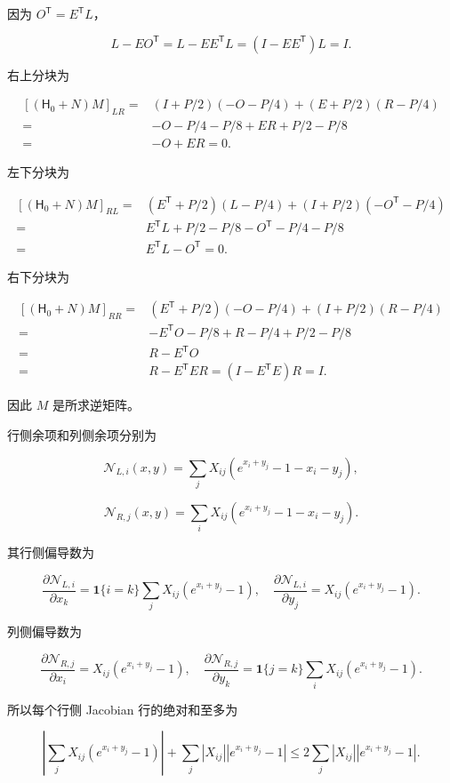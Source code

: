 \documentclass[11pt,a4paper]{article}
\begin{document}
因为 \(O^{\mathsf T}=E^{\mathsf T}L\)，

\[
L-EO^{\mathsf T}=L-EE^{\mathsf T}L=(I-EE^{\mathsf T})L=I.
\]

右上分块为

\[
\begin{aligned}
[(\mathsf H_0+N)M]_{LR}
={}&(I+P/2)(-O-P/4)+(E+P/2)(R-P/4)\\
={}&-O-P/4-P/8+ER+P/2-P/8\\
={}&-O+ER=0.
\end{aligned}
\]

左下分块为

\[
\begin{aligned}
[(\mathsf H_0+N)M]_{RL}
={}&(E^{\mathsf T}+P/2)(L-P/4)+(I+P/2)(-O^{\mathsf T}-P/4)\\
={}&E^{\mathsf T}L+P/2-P/8-O^{\mathsf T}-P/4-P/8\\
={}&E^{\mathsf T}L-O^{\mathsf T}=0.
\end{aligned}
\]

右下分块为

\[
\begin{aligned}
[(\mathsf H_0+N)M]_{RR}
={}&(E^{\mathsf T}+P/2)(-O-P/4)+(I+P/2)(R-P/4)\\
={}&-E^{\mathsf T}O-P/8+R-P/4+P/2-P/8\\
={}&R-E^{\mathsf T}O\\
={}&R-E^{\mathsf T}ER=(I-E^{\mathsf T}E)R=I.
\end{aligned}
\]

因此 \(M\) 是所求逆矩阵。

行侧余项和列侧余项分别为

\[
\mathcal N_{L,i}(x,y)=\sum_jX_{ij}(e^{x_i+y_j}-1-x_i-y_j),
\]

\[
\mathcal N_{R,j}(x,y)=\sum_iX_{ij}(e^{x_i+y_j}-1-x_i-y_j).
\]

其行侧偏导数为

\[
\frac{\partial\mathcal N_{L,i}}{\partial x_k}
=\mathbf1\{i=k\}\sum_jX_{ij}(e^{x_i+y_j}-1),\quad
\frac{\partial\mathcal N_{L,i}}{\partial y_j}=X_{ij}(e^{x_i+y_j}-1).
\]

列侧偏导数为

\[
\frac{\partial\mathcal N_{R,j}}{\partial x_i}=X_{ij}(e^{x_i+y_j}-1),\quad
\frac{\partial\mathcal N_{R,j}}{\partial y_k}
=\mathbf1\{j=k\}\sum_iX_{ij}(e^{x_i+y_j}-1).
\]

所以每个行侧 Jacobian 行的绝对和至多为

\[
\left|\sum_jX_{ij}(e^{x_i+y_j}-1)\right|
+\sum_j|X_{ij}||e^{x_i+y_j}-1|
\le2\sum_j|X_{ij}||e^{x_i+y_j}-1|.
\]
\end{document}
